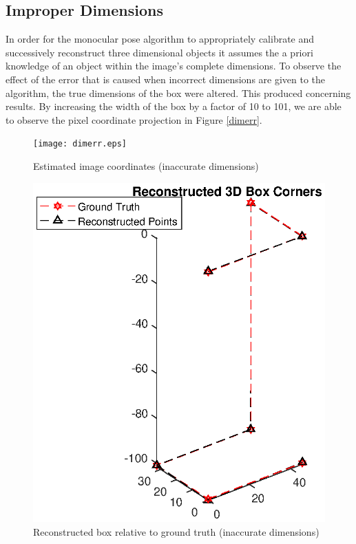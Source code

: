 \documentclass[12pt]{article}
\begin{document}
\subsection{Improper Dimensions}
In order for the monocular pose algorithm to appropriately calibrate and successively reconstruct three dimensional objects it assumes the a priori knowledge of an object within the image's complete dimensions. To observe the effect of the error that is caused when incorrect dimensions are given to the algorithm, the true dimensions of the box were altered. This produced concerning results. By increasing the width of the box by a factor of 10 to 101, we are able to observe the pixel coordinate projection in Figure \ref{dimerr}. 
\begin{figure}[h]
	\centering %
	\captionsetup{justification=centering}
	\begin{minipage}{0.5\textwidth}
		\centering
		\texttt{[image: dimerr.eps]}
		\caption{Estimated image coordinates (inaccurate dimensions)} \label{dimerr}
	\end{minipage}\hfill
	\begin{minipage}{0.5\textwidth}
		\centering %
		\includegraphics[width=1\textwidth]{dimerr_recon.eps}
		\caption{Reconstructed box relative to ground truth (inaccurate dimensions)} \label{dimerrrecon}
	\end{minipage}
\end{figure}
\end{document}
